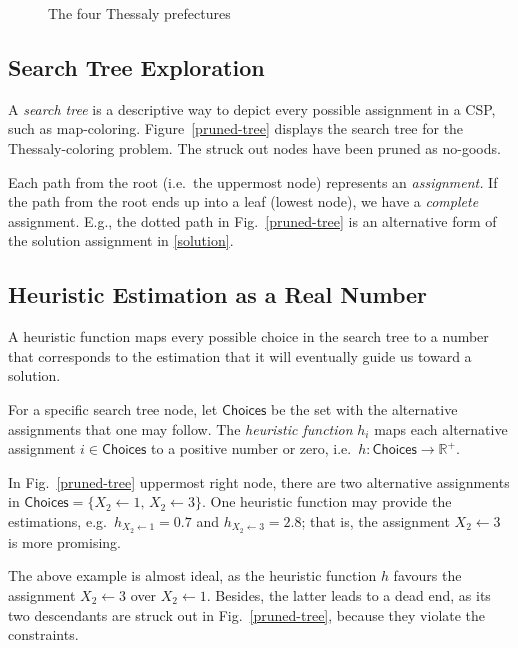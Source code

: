 \documentclass{ws-ijait}
\begin{document}
\begin{figure}
\centering

\caption{The four Thessaly prefectures\label{map-colored}} %
\end{figure}


\subsection{Search Tree Exploration}

A \emph{search tree} is a descriptive way to depict every possible assignment in a CSP, such as map-coloring. Figure~\ref{pruned-tree} displays the search tree for the Thessaly-coloring problem. The struck out nodes have been pruned as no-goods.

Each path from the root (i.e.\ the uppermost node) represents an \emph{assignment.} If the path from the root ends up into a leaf (lowest node), we have a \emph{complete} assignment. E.g., the dotted path in Fig.~\ref{pruned-tree} is an alternative form of the solution assignment in \eqref{solution}.


\subsection{Heuristic Estimation as a Real Number}

A heuristic function maps every possible choice in the search tree to a number that corresponds to the estimation that it will eventually guide us toward a solution.
\begin{definition}
For a specific search tree node, let $\mathsf{Choices}$ be the set with the alternative assignments that one may follow. The \emph{heuristic function} $h_i$ maps each alternative assignment $i \in \mathsf{Choices}$ to a positive number or zero, i.e.\ $h: \mathsf{Choices} \to \mathbb{R}^+$.
\end{definition}
\begin{example}
In Fig.~\ref{pruned-tree} uppermost right node, there are two alternative assignments in $\mathsf{Choices} = \{ X_2 \gets 1, \, X_2 \gets 3 \}$. One heuristic function may provide the estimations, e.g.\ $h_{X_2 \gets 1} = 0.7$ and $h_{X_2 \gets 3} = 2.8$; that is, the assignment $X_2 \gets 3$ is more promising.
\end{example}
The above example is almost ideal, as the heuristic function $h$ favours the assignment $X_2 \gets 3$ over $X_2 \gets 1$. Besides, the latter leads to a dead end, as its two descendants are struck out in Fig.~\ref{pruned-tree}, because they violate the constraints.
\end{document}
